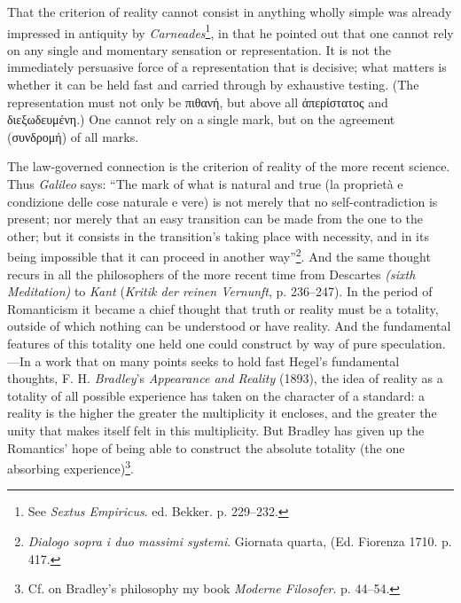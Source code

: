 \documentclass[12pt,a4paper]{book}
\newcommand{\opage}[1]{\marginnote{\footnotesize\textit{[#1]}}}
\begin{document}
That the criterion of reality cannot consist in anything wholly simple was
already impressed in antiquity by \emph{Carneades}\footnote{See \emph{Sextus
Empiricus}. ed. Bekker. p. 229--232.}, in that he pointed out that one
cannot rely on any single and momentary sensation or representation. It is
not the immediately persuasive force of a representation that is decisive;
what matters is whether it can be held fast and carried through by
exhaustive testing. (The representation must not only be πιθανή, but above
all ἀπερίστατος and διεξωδευμένη.) One cannot rely on a single mark, but on
the agreement (συνδρομή) of all marks.

The law-governed connection is the criterion of reality of the more recent
science. Thus \emph{Galileo} says: ``The mark \opage{105}of what is natural and true
(la proprietà e condizione delle cose naturale e vere) is not merely that
no self-contradiction is present; nor merely that an easy transition can be
made from the one to the other; but it consists in the transition's taking
place with necessity, and in its being impossible that it can proceed in
another way''\footnote{\emph{Dialogo sopra i duo massimi systemi}. Giornata
quarta, (Ed. Fiorenza 1710. p. 417.}. And the same thought recurs in all
the philosophers of the more recent time from Descartes \emph{(sixth
Meditation)} to \emph{Kant} (\emph{Kritik der reinen Vernunft}, p.
236--247). In the period of Romanticism it became a chief thought that
truth or reality must be a totality, outside of which nothing can be
understood or have reality. And the fundamental features of this totality
one held one could construct by way of pure speculation.---In a work that
on many points seeks to hold fast Hegel's fundamental thoughts, F. H.
\emph{Bradley}'s \emph{Appearance and Reality} (1893), the idea of reality
as a totality of all possible experience has taken on the character of a
standard: a reality is the higher the greater the multiplicity it encloses,
and the greater the unity that makes itself felt in this multiplicity. But
Bradley has given up the Romantics' hope of being able to construct the
absolute totality (the one absorbing experience)\footnote{Cf. on Bradley's
philosophy my book \emph{Moderne Filosofer}. p. 44--54.}.
\end{document}
